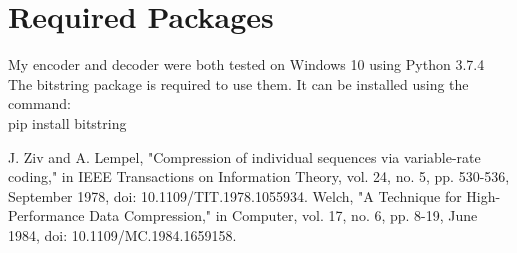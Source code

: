 \documentclass[11pt,a4paper]{article}
\begin{document}
\section*{Required Packages}
My encoder and decoder were both tested on Windows 10 using Python 3.7.4 \\
The bitstring package is required to use them. It can be installed using the command: \\ pip install bitstring
\begin{thebibliography}{9}
J. Ziv and A. Lempel, "Compression of individual sequences via variable-rate coding," in IEEE Transactions on Information Theory, vol. 24, no. 5, pp. 530-536, September 1978, doi: 10.1109/TIT.1978.1055934.
Welch, "A Technique for High-Performance Data Compression," in Computer, vol. 17, no. 6, pp. 8-19, June 1984, doi: 10.1109/MC.1984.1659158.
\end{thebibliography}
\end{document}
